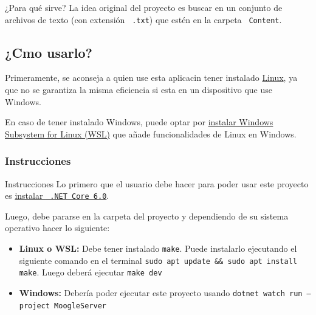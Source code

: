 \documentclass{beamer}
\begin{document}
\begin{frame}{¿Para qué sirve?}
  La idea original del proyecto es buscar en un conjunto de archivos de texto
  (con extensión {\tt \color{gray45} .txt}) que estén en la carpeta {\tt
      \color{gray45}Content}.
\end{frame}

\subsection*{¿Cmo usarlo?}

\begin{frame}
  Primeramente, se aconseja a quien use esta aplicacin tener instalado
  \href{https://es.wikipedia.org/wiki/Linux}{Linux}, ya que no se garantiza la
  misma eficiencia si esta en un dispositivo que use Windows.
\end{frame}

\begin{frame}
  En caso de tener instalado Windows, puede optar por
  \href{https://learn.microsoft.com/es-es/windows/wsl/install}{instalar Windows
    Subsystem for Linux (WSL)} que a\~nade funcionalidades de Linux en Windows.
\end{frame}

\subsubsection*{Instrucciones}

\begin{frame}{Instrucciones}
  Lo primero que el usuario debe hacer para poder usar este proyecto es
  \href{https://learn.microsoft.com/es-es/dotnet/core/install/}{instalar {\tt
        .NET Core 6.0}}.

  \pause

  Luego, debe pararse en la carpeta del proyecto y dependiendo de su sistema
  operativo hacer lo siguiente:

  \begin{itemize}[<+->]
    \item {\bf Linux o WSL:} Debe tener instalado {\tt make}. Puede instalarlo ejecutando el siguiente comando en el terminal {\tt sudo apt update \&\& sudo apt install make}. Luego deber\'a ejecutar {\tt make dev}
    \item {\bf Windows:}  Debería poder ejecutar este proyecto usando {\tt dotnet watch run --project MoogleServer}
  \end{itemize}
\end{frame}
\end{document}
